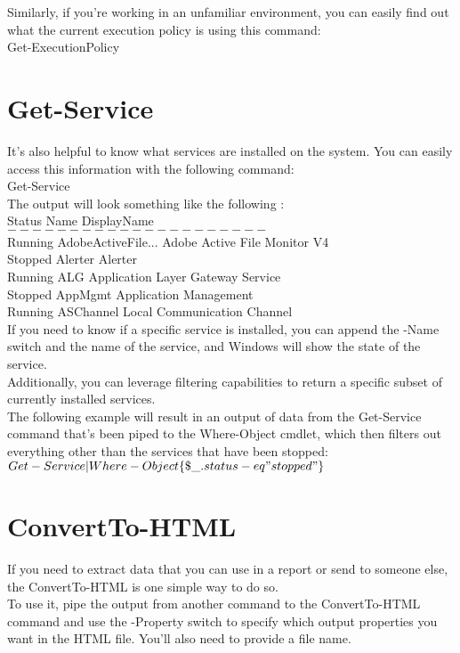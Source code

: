 \documentclass[12pt]{article}
\begin{document}
Similarly, if you’re working in an unfamiliar environment, you can easily find out what the current execution policy is using this command:\\

Get-ExecutionPolicy



\section{Get-Service}

It’s also helpful to know what services are installed on the system. You can easily access this information with the following command:\\

Get-Service \\
The output will look something like the following :\\

Status Name DisplayName\\
$------ ---- -----------$ \\
Running AdobeActiveFile... Adobe Active File Monitor V4\\
Stopped Alerter Alerter\\
Running ALG Application Layer Gateway Service\\
Stopped AppMgmt Application Management\\
Running ASChannel Local Communication Channel\\
If you need to know if a specific service is installed, you can append the -Name switch and the name of the service, and Windows will show the state of the service.\\
 Additionally, you can leverage filtering capabilities to return a specific subset of currently installed services.\\ 
 The following example will result in an output of data from the Get-Service command that’s been piped to the Where-Object cmdlet, which then filters out everything other than the services that have been stopped:\\

$ Get-Service | Where-Object \{\$\_.status -eq "stopped"\}$


\section{ConvertTo-HTML}
If you need to extract data that you can use in a report or send to someone    else, the ConvertTo-HTML is one simple way to do so.\\
 To use it, pipe the output from another command to the ConvertTo-HTML command and use the -Property switch to specify which output properties you want in the HTML file. You’ll also need to provide a file name.\\
\end{document}
